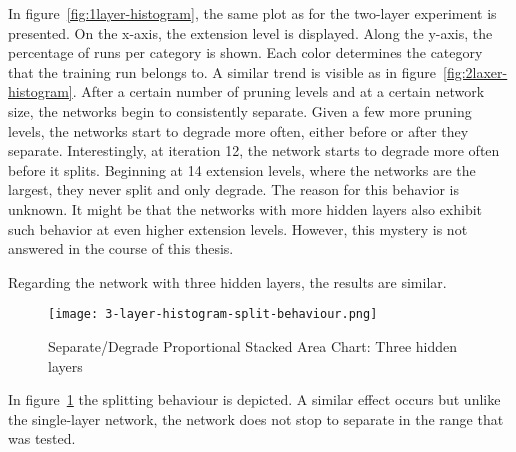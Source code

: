 In figure~\ref{fig:1layer-histogram}, the same plot as for the two-layer experiment is presented.
On the x-axis, the extension level is displayed. 
Along the y-axis, the percentage of runs per category is shown.
Each color determines the category that the training run belongs to.
A similar trend is visible as in figure~\ref{fig:2laxer-histogram}.
After a certain number of pruning levels and at a certain network size, the networks begin to consistently separate.
Given a few more pruning levels, the networks start to degrade more often, either before or after they separate.
Interestingly, at iteration 12, the network starts to degrade more often before it splits.
Beginning at 14 extension levels, where the networks are the largest, they never split and only degrade.
The reason for this behavior is unknown.
It might be that the networks with more hidden layers also exhibit such behavior at even higher extension levels. 
However, this mystery is not answered in the course of this thesis.

Regarding the network with three hidden layers, the results are similar.
\begin{figure}[ht] %
    \centering
    \texttt{[image: 3-layer-histogram-split-behaviour.png]}
    \caption{
        Separate/Degrade Proportional Stacked Area Chart: Three hidden layers
    }\label{fig:3layer-histogram}
\end{figure}
In figure~\ref{fig:3layer-histogram} the splitting behaviour is depicted.
A similar effect occurs but unlike the single-layer network, the network does not stop to separate in the range that was tested. 


